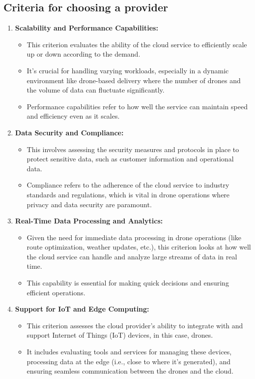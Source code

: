 \documentclass{article}
\begin{document}
\subsection{Criteria for choosing a provider}
\begin{enumerate}
    \item \textbf{Scalability and Performance Capabilities:}
    \begin{itemize}
        \item This criterion evaluates the ability of the cloud service to efficiently scale up or down according to the demand.
        \item It's crucial for handling varying workloads, especially in a dynamic environment like drone-based delivery where the number of drones and the volume of data can fluctuate significantly.
        \item Performance capabilities refer to how well the service can maintain speed and efficiency even as it scales.
    \end{itemize}

    \item \textbf{Data Security and Compliance:}
    \begin{itemize}
        \item This involves assessing the security measures and protocols in place to protect sensitive data, such as customer information and operational data.
        \item Compliance refers to the adherence of the cloud service to industry standards and regulations, which is vital in drone operations where privacy and data security are paramount.
    \end{itemize}
    
    \item \textbf{Real-Time Data Processing and Analytics:} 
    \begin{itemize}
        \item Given the need for immediate data processing in drone operations (like route optimization, weather updates, etc.), this criterion looks at how well the cloud service can handle and analyze large streams of data in real time.
        \item This capability is essential for making quick decisions and ensuring efficient operations.
    \end{itemize}

    \item \textbf{Support for IoT and Edge Computing:}
    \begin{itemize}
        \item This criterion assesses the cloud provider's ability to integrate with and support Internet of Things (IoT) devices, in this case, drones. 
        \item It includes evaluating tools and services for managing these devices, processing data at the edge (i.e., close to where it's generated), and ensuring seamless communication between the drones and the cloud.
    \end{itemize}
    

\end{enumerate}
\end{document}
